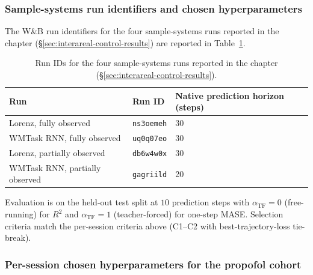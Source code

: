 \subsubsection{Sample-systems run identifiers and chosen hyperparameters}\label{supp:interareal-control-sample-runs}

The W\&B run identifiers for the four sample-systems runs reported in the chapter (\S\ref{sec:interareal-control-results}) are reported in Table~\ref{tab:supp-interareal-control-sample-ids}.

\begin{table}[h!]
\centering
\small
\caption[Sample-systems run identifiers]{Run IDs for the four sample-systems runs reported in the chapter (\S\ref{sec:interareal-control-results}).}
\label{tab:supp-interareal-control-sample-ids}
\begin{tabular}{lll}
\toprule
Run                                  & Run ID         & Native prediction horizon (steps) \\
\midrule
Lorenz, fully observed               & \texttt{ns3oemeh} & 30 \\
WMTask RNN, fully observed           & \texttt{uq0q07eo} & 30 \\
Lorenz, partially observed           & \texttt{db6w4w0x} & 30 \\
WMTask RNN, partially observed       & \texttt{gagriild} & 20 \\
\bottomrule
\end{tabular}
\end{table}

Evaluation is on the held-out test split at $10$ prediction steps with $\alpha_{\mathrm{TF}}=0$ (free-running) for $R^{2}$ and $\alpha_{\mathrm{TF}}=1$ (teacher-forced) for one-step MASE. Selection criteria match the per-session criteria above (C1--C2 with best-trajectory-loss tie-break).

\subsubsection{Per-session chosen hyperparameters for the propofol cohort}\label{supp:interareal-control-per-session-chosen}


